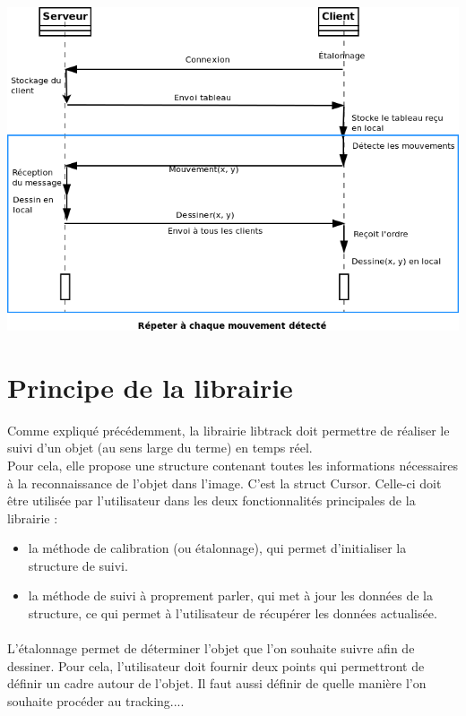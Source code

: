 \documentclass{article}
\begin{document}
\begin{center}
	\includegraphics[scale=0.5]{../uml/sequence_reseau.png}
\end{center}

\section{Principe de la librairie}
Comme expliqué précédemment, la librairie libtrack doit permettre de réaliser le suivi d'un objet (au sens large du terme) en temps réel.\\
Pour cela, elle propose une structure contenant toutes les informations nécessaires à la reconnaissance de l'objet dans l'image. C'est la struct Cursor.
Celle-ci doit être utilisée par l'utilisateur dans les deux fonctionnalités principales de la librairie : \begin{itemize}
\item la méthode de calibration (ou étalonnage), qui permet d'initialiser la structure de suivi.
\item la méthode de suivi à proprement parler, qui met à jour les données de la structure, ce qui permet à l'utilisateur de récupérer les données actualisée.
\end{itemize}

\paragraph{}
L'étalonnage permet de déterminer l'objet que l'on souhaite suivre afin de dessiner. Pour cela, l'utilisateur doit fournir deux points qui permettront de définir un cadre autour de l'objet.
Il faut aussi définir de quelle manière l'on souhaite procéder au tracking....
\end{document}
